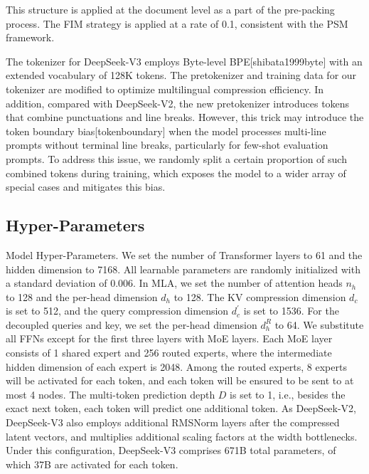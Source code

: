 \documentclass[11pt,a4paper]{article}
\begin{document}
This structure is applied at the document level as a part of the pre-packing process. The FIM strategy is applied at a rate of 0.1, consistent with the PSM framework.

The tokenizer for DeepSeek-V3 employs Byte-level BPE[shibata1999byte] with an extended vocabulary of 128K tokens. The pretokenizer and training data for our tokenizer are modified to optimize multilingual compression efficiency. In addition, compared with DeepSeek-V2, the new pretokenizer introduces tokens that combine punctuations and line breaks. However, this trick may introduce the token boundary bias[tokenboundary] when the model processes multi-line prompts without terminal line breaks, particularly for few-shot evaluation prompts. To address this issue, we randomly split a certain proportion of such combined tokens during training, which exposes the model to a wider array of special cases and mitigates this bias.

\subsection{Hyper-Parameters}

Model Hyper-Parameters. We set the number of Transformer layers to 61 and the hidden dimension to 7168. All learnable parameters are randomly initialized with a standard deviation of 0.006. In MLA, we set the number of attention heads  $n_h$  to 128 and the per-head dimension  $d_h$  to 128. The KV compression dimension  $d_c$  is set to 512, and the query compression dimension  $d_c^{\prime}$  is set to 1536. For the decoupled queries and key, we set the per-head dimension  $d_h^R$  to 64. We substitute all FFNs except for the first three layers with MoE layers. Each MoE layer consists of 1 shared expert and 256 routed experts, where the intermediate hidden dimension of each expert is 2048. Among the routed experts, 8 experts will be activated for each token, and each token will be ensured to be sent to at most 4 nodes. The multi-token prediction depth  $D$  is set to 1, i.e., besides the exact next token, each token will predict one additional token. As DeepSeek-V2, DeepSeek-V3 also employs additional RMSNorm layers after the compressed latent vectors, and multiplies additional scaling factors at the width bottlenecks. Under this configuration, DeepSeek-V3 comprises 671B total parameters, of which 37B are activated for each token.
\end{document}
